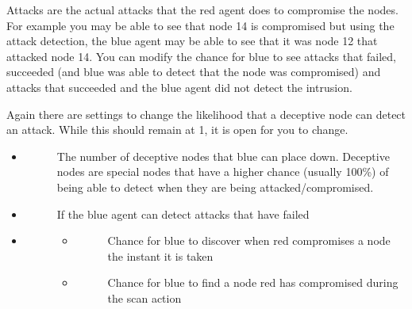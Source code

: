 \documentclass[letterpaper,10pt,english]{sphinxmanual}
\begin{document}
\sphinxAtStartPar
{}

\sphinxAtStartPar
Attacks are the actual attacks that the red agent does to compromise the nodes. For example you may be able to see
that node 14 is compromised but using the attack detection, the blue agent may be able to see that it was node 12
that attacked node 14. You can modify the chance for blue to see attacks that failed, succeeded (and blue was able
to detect that the node was compromised) and attacks that succeeded and the blue agent did not detect the intrusion.

\sphinxAtStartPar
Again there are settings to change the likelihood that a deceptive node can detect an attack. While this should
remain at 1, it is open for you to change.
\begin{itemize}
\item {} \begin{description}
\item[{}] \leavevmode
\sphinxAtStartPar
The number of deceptive nodes that blue can place down. Deceptive nodes are special nodes that have a higher chance (usually 100\%) of being able to detect when they are being attacked/compromised.

\end{description}

\item {} \begin{description}
\item[{}] \leavevmode
\sphinxAtStartPar
If the blue agent can detect attacks that have failed

\end{description}

\item {} \begin{description}
\item[{}] \leavevmode\begin{itemize}
\item {} \begin{description}
\item[{}] \leavevmode
\sphinxAtStartPar
Chance for blue to discover when red compromises a node the instant it is taken

\end{description}

\item {} \begin{description}
\item[{}] \leavevmode
\sphinxAtStartPar
Chance for blue to find a node red has compromised during the scan action


\end{description}
\end{itemize}
\end{description}
\end{itemize}
\end{document}
